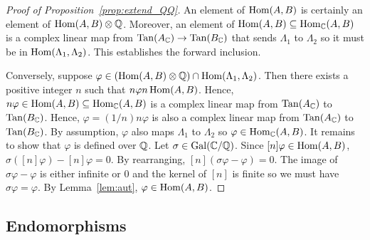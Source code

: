 \begin{proof}[Proof of Proposition~\ref{prop:extend_QQ}]
    An element of $\operatorname{Hom}(A, B)$ is certainly an element of $\operatorname{Hom}(A, B)\otimes
    \mathbb{Q}$. Moreover, an element of $\operatorname{Hom}(A, B) \subseteq \operatorname{Hom}_{\mathbb{C}} (A,B)$ is a
    complex linear map from $\operatorname{Tan}(A_{\mathbb{C}})\to \operatorname{Tan}(B_{\mathbb{C}})$ that sends $\Lambda_1$
    to $\Lambda_2$ so it must be in $\operatorname{Hom}(\Lambda_1,\Lambda_2)$. This
    establishes the forward inclusion.

    Conversely, suppose $\varphi\in (\operatorname{Hom}(A, B)\otimes \mathbb{Q})\cap \operatorname{Hom}(\Lambda_1,
    \Lambda_2)$. Then there exists a positive integer $n$ such that $n\varphi n
    \operatorname{Hom}(A, B)$. Hence, $n\varphi\in \operatorname{Hom}(A,B)\subseteq \operatorname{Hom}_{\mathbb{C}}(A, B)$ is a
    complex linear map from $\operatorname{Tan}(A_{\mathbb{C}})$ to $\operatorname{Tan}(B_{\mathbb{C}})$. Hence,
    $\varphi=(1/n)n\varphi$ is also a complex linear map from $\operatorname{Tan}(A_{\mathbb{C}})$ to
    $\operatorname{Tan}(B_{\mathbb{C}})$. By assumption, $\varphi$ also maps $\Lambda_1$ to
    $\Lambda_2$ so $\varphi\in \operatorname{Hom}_{\mathbb{C}}(A,B)$. It remains to show that
    $\varphi$ is defined over $\mathbb{Q}$. Let $\sigma\in \operatorname{Gal}(\mathbb{C}/\mathbb{Q})$. Since
    $[n]\varphi\in \operatorname{Hom}(A,B)$, $\sigma([n]\varphi)-[n]\varphi=0$. By
    rearranging, $[n](\sigma\varphi-\varphi)=0$. The image of
    $\sigma\varphi-\varphi$ is either infinite or 0 and the kernel of $[n]$ is
    finite so we must have $\sigma\varphi=\varphi$. By Lemma~\ref{lem:aut},
    $\varphi\in \operatorname{Hom}(A,B)$.
\end{proof}

\subsection{Endomorphisms}%
\label{sub:endomorphisms}


